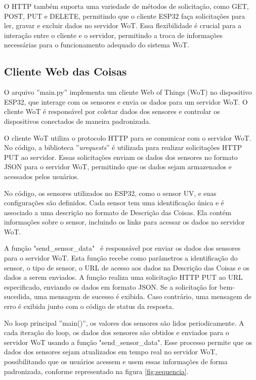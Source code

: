 O HTTP também suporta uma variedade de métodos de solicitação, como GET, POST, PUT e DELETE, permitindo que o cliente ESP32 faça solicitações para ler, gravar e excluir dados no servidor WoT. Essa flexibilidade é crucial para a interação entre o cliente e o servidor, permitindo a troca de informações necessárias para o funcionamento adequado do sistema WoT.

\subsection{Cliente Web das Coisas}

O arquivo ''main.py'' implementa um cliente Web of Things (WoT) no dispositivo ESP32, que interage com os sensores e envia os dados para um servidor WoT. O cliente WoT é responsável por coletar dados dos sensores e controlar os dispositivos conectados de maneira padronizada.

O cliente WoT utiliza o protocolo HTTP para se comunicar com o servidor WoT. No código, a biblioteca ''\textit{urequests}'' é utilizada para realizar solicitações HTTP PUT ao servidor. Essas solicitações enviam os dados dos sensores no formato JSON para o servidor WoT, permitindo que os dados sejam armazenados e acessados pelos usuários.

No código, os sensores utilizados no ESP32, como o sensor UV, e suas configurações são definidos. Cada sensor tem uma identificação única e é associado a uma descrição no formato de Descrição das Coisas. Ela contém informações sobre o sensor, incluindo os links para acessar os dados no servidor WoT.

A função "send\_sensor\_data" \ é responsável por enviar os dados dos sensores para o servidor WoT. Esta função recebe como parâmetros a identificação do sensor, o tipo de sensor, o URL de acesso aos dados na Descrição das Coisas e os dados a serem enviados. A função realiza uma solicitação HTTP PUT ao URL especificado, enviando os dados em formato JSON. Se a solicitação for bem-sucedida, uma mensagem de sucesso é exibida. Caso contrário, uma mensagem de erro é exibida junto com o código de status da resposta.

No loop principal ''main()'', os valores dos sensores são lidos periodicamente. A cada iteração do loop, os dados dos sensores são obtidos e enviados para o servidor WoT usando a função "send\_sensor\_data". Esse processo permite que os dados dos sensores sejam atualizados em tempo real no servidor WoT, possibilitando que os usuários acessem e usem essas informações de forma padronizada, conforme representado na figura \ref{fig:sequencia}.

